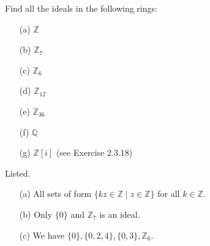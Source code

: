   \begin{exercise}[Shifrin 4.1.4.a/b/c]
    Find all the ideals in the following rings:
    \begin{enumerate}
      \item[(a)] $\mathbb{Z}$
      \item[(b)] $\mathbb{Z}_7$
      \item[(c)] $\mathbb{Z}_6$
      \item[(d)] $\mathbb{Z}_{12}$
      \item[(e)] $\mathbb{Z}_{36}$
      \item[(f)] $\mathbb{Q}$
      \item[(g)] $\mathbb{Z}[i]$ (see Exercise 2.3.18)
    \end{enumerate}
  \end{exercise}
  \begin{solution}
    Listed. 
    \begin{enumerate}
      \item[(a)] All sets of form $\{k z \in \mathbb{Z} \mid z \in \mathbb{Z}\}$ for all $k \in \mathbb{Z}$. 
      \item[(b)] Only $\{0\}$ and $\mathbb{Z}_7$ is an ideal. 
      \item[(c)] We have $\{0\}, \{0, 2, 4\}, \{0, 3\}, \mathbb{Z}_6$. 
    \end{enumerate}
  \end{solution}

